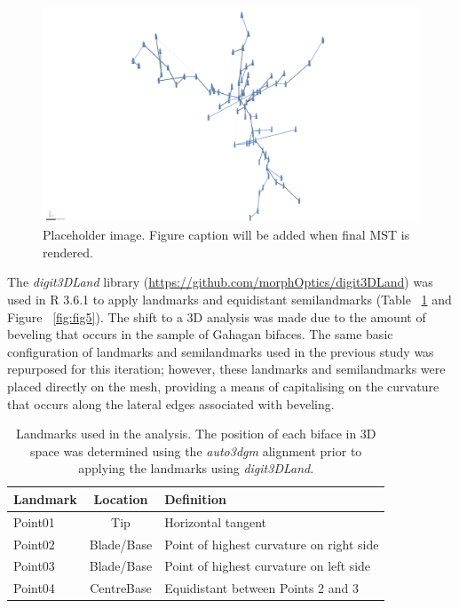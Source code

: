 \documentclass[review]{elsarticle}
\begin{document}
\begin{figure}[ht]\centering
\includegraphics[width=\linewidth]{fig04}
\caption{Placeholder image. Figure caption will be added when final MST is rendered.}
\label{fig:fig4}
\end{figure}

The \textit{digit3DLand} library (\href{https://github.com/morphOptics/digit3DLand}{https://github.com/morphOptics/digit3DLand}) was used in R 3.6.1 \citep{R} to apply landmarks and equidistant semilandmarks (Table ~\ref{tab:Tbl1} and Figure ~\ref{fig:fig5}). The shift to a 3D analysis was made due to the amount of beveling that occurs in the sample of Gahagan bifaces. The same basic configuration of landmarks and semilandmarks used in the previous study \citep[Figure 3]{RN11783} was repurposed for this iteration; however, these landmarks and semilandmarks were placed directly on the mesh, providing a means of capitalising on the curvature that occurs along the lateral edges associated with beveling.

\begin{table}[tbh]\centering
\footnotesize
\caption{Landmarks used in the analysis. The position of each biface in 3D space was determined using the \textit{auto3dgm} alignment prior to applying the landmarks using \textit{digit3DLand}.}
\centering
\begin{tabular}{lcp{7.5cm}}
\toprule
Landmark & Location & Definition\\
\midrule
Point01 & Tip & Horizontal tangent\\
Point02 & Blade/Base & Point of highest curvature on right side\\
Point03 & Blade/Base & Point of highest curvature on left side\\
Point04 & CentreBase & Equidistant between Points 2 and 3\\
\bottomrule
\end{tabular}
\label{tab:Tbl1}
\end{table}
\end{document}
